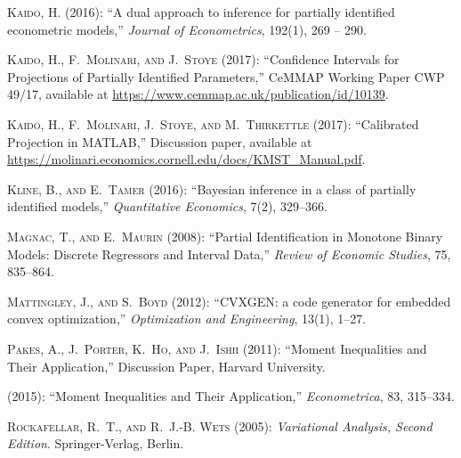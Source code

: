 \documentclass[letterpaper,11pt]{article}
\theoremstyle{myplain}
\theoremstyle{mydefinition}
\theoremstyle{myremark}
\numberwithin{equation}{section}
\numberwithin{figure}{section}
\begin{document}
\begin{thebibliography}{}
\textsc{Kaido, H.}  (2016): ``A dual approach to inference for partially
  identified econometric models,'' \emph{Journal of Econometrics}, 192(1), 269
  -- 290.

\textsc{Kaido, H., F.~Molinari,  {\small and} J.~Stoye}  (2017): ``Confidence
  Intervals for Projections of Partially Identified Parameters,'' CeMMAP
  Working Paper CWP 49/17, available at
  \url{https://www.cemmap.ac.uk/publication/id/10139}.

\textsc{Kaido, H., F.~Molinari, J.~Stoye,  {\small and} M.~Thirkettle}  (2017):
  ``Calibrated Projection in MATLAB,'' Discussion paper, available at
  \url{https://molinari.economics.cornell.edu/docs/KMST_Manual.pdf}.

\textsc{Kline, B.,  {\small and} E.~Tamer}  (2016): ``Bayesian inference in a
  class of partially identified models,'' \emph{Quantitative Economics}, 7(2),
  329--366.

\textsc{Magnac, T.,  {\small and} E.~Maurin}  (2008): ``Partial Identification
  in Monotone Binary Models: Discrete Regressors and Interval Data,''
  \emph{Review of Economic Studies}, 75, 835--864.

\textsc{Mattingley, J.,  {\small and} S.~Boyd}  (2012): ``{CVXGEN: a code
  generator for embedded convex optimization},'' \emph{Optimization and
  Engineering}, 13(1), 1--27.

\textsc{Pakes, A., J.~Porter, K.~Ho,  {\small and} J.~Ishii}  (2011): ``Moment
  Inequalities and Their Application,'' Discussion Paper, Harvard University.

\textsc{\BySame{}}  (2015): ``Moment Inequalities and Their Application,''
  \emph{Econometrica}, 83, 315--334.

\textsc{Rockafellar, R.~T.,  {\small and} R.~J.-B. Wets}  (2005):
  \emph{Variational Analysis, Second Edition}. Springer-Verlag, Berlin.


\end{thebibliography}
\end{document}

